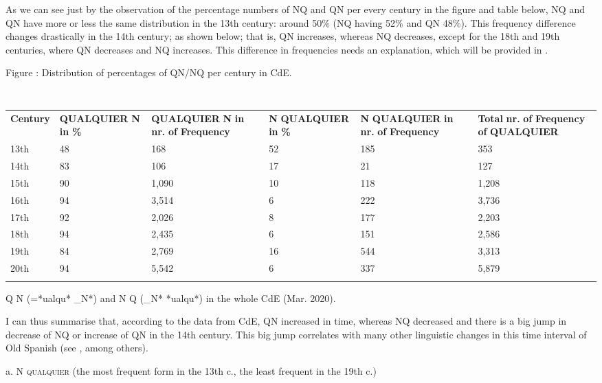   As we can see just by the observation of the percentage numbers of NQ and QN per every century in the figure and table below, NQ and QN have more or less the same distribution in the 13th century: around 50\% (NQ having 52\% and QN 48\%). This frequency difference changes drastically in the 14th century; as shown below; that is, QN increases, whereas NQ decreases, except for the 18th and 19th centuries, where QN decreases and NQ increases. This difference in frequencies needs an explanation, which will be provided in .


\begin{table}
{Figure : Distribution of percentages of QN/NQ per century in CdE.}

\begin{tabularx}{\textwidth}{XXXXXX}
 \textbf{Century} & \textbf{QUALQUIER} \textbf{N} \textbf{in} \textbf{\%} & \textbf{QUALQUIER} \textbf{N} \textbf{in} \textbf{nr.} \textbf{of} \textbf{Frequency} & \textbf{N} \textbf{QUALQUIER} \textbf{in} \textbf{\%} & \textbf{N} \textbf{QUALQUIER} \textbf{in} \textbf{nr.} \textbf{of} \textbf{Frequency} & \textbf{Total} \textbf{nr.} \textbf{of} \textbf{Frequency} \textbf{of} \textbf{QUALQUIER}\\
 13th & 48 & 168 & 52 & 185 & 353\\
 14th & 83 & 106 & 17 & 21 & 127\\
 15th & 90 & 1,090 & 10 & 118 & 1,208\\
 16th & 94 & 3,514 & 6 & 222 & 3,736\\
 17th & 92 & 2,026 & 8 & 177 & 2,203\\
 18th & 94 & 2,435 & 6 & 151 & 2,586\\
 19th & 84 & 2,769 & 16 & 544 & 3,313\\
 20th & 94 & 5,542 & 6 & 337 & 5,879\\
\lspbottomrule
\end{tabularx}
\caption{\label{tab:} ~}Q N (=*ualqu* \_N*) and N Q (\_N* *ualqu*) in the whole CdE (Mar. 2020).
\end{table}

I can thus summarise that, according to the data from CdE, QN increased in time, whereas NQ decreased and there is a big jump in decrease of NQ or increase of QN in the 14th century. This big jump correlates with many other linguistic changes in this time interval of Old Spanish (see \citealt{Eberenz2009}, among others).

  a.  N \textsc{qualquier} (the most frequent form in the 13th c., the least frequent in the 19th c.)

